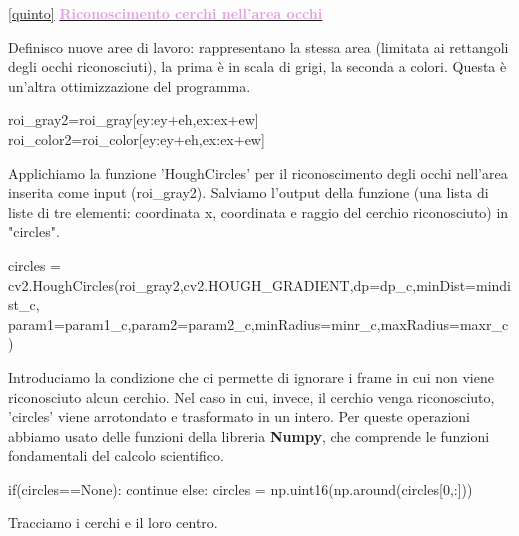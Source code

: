 \documentclass[12pt]{article}
\begin{document}
{ \ref {quinto} \underline{\textbf{\textcolor{Plum}{Riconoscimento cerchi nell'area occhi}}}
 
 \vspace{1cm} 	
 
 
 Definisco nuove aree di lavoro: rappresentano la stessa area (limitata ai rettangoli degli occhi riconosciuti), la prima \`e in scala di grigi, la seconda a colori. Questa \`e un'altra ottimizzazione del programma.
 \vspace{1cm}
 \begin{codice}
                roi_gray2=roi_gray[ey:ey+eh,ex:ex+ew]
                roi_color2=roi_color[ey:ey+eh,ex:ex+ew]

\end{codice}

\vspace{1cm}

Applichiamo la funzione 'HoughCircles' per il riconoscimento degli occhi nell'area inserita come input (roi\_gray2). Salviamo l'output della funzione (una lista di liste di tre elementi: coordinata x, coordinata  e raggio del cerchio riconosciuto) in "circles".
\vspace{1cm}

\begin{codice}
                circles = cv2.HoughCircles(roi_gray2,cv2.HOUGH_GRADIENT,dp=dp_c,minDist=mindist_c,
                            param1=param1_c,param2=param2_c,minRadius=minr_c,maxRadius=maxr_c)

\end{codice}
\vspace{1cm}

Introduciamo la condizione che ci permette di ignorare i frame in cui non viene riconosciuto alcun cerchio. Nel caso in cui, invece, il cerchio venga riconosciuto, 'circles' viene  arrotondato e trasformato in un intero. Per queste operazioni abbiamo usato delle funzioni della libreria \textbf{Numpy}, che comprende le funzioni fondamentali del calcolo scientifico.
\vspace{1cm}
\begin{codice}
                if(circles==None):
                    continue
                else:
                     circles = np.uint16(np.around(circles[0,:]))
\end{codice}

\vspace{1cm}

Tracciamo i cerchi e il loro centro.
\vspace{1cm}

}
\end{document}
